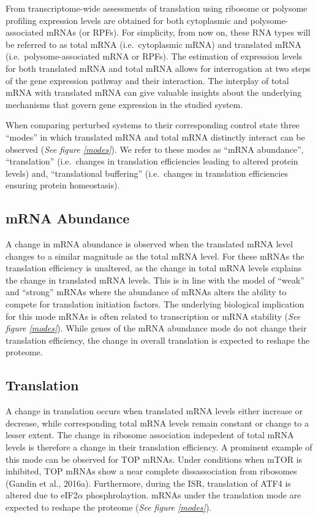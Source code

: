 \documentclass[12pt,openany]{book}
\begin{document}
From transcriptome-wide assessments of translation using ribosome or
polysome profiling expression levels are obtained for both cytoplasmic
and polysome-associated mRNAs (or RPFs). For simplicity, from now on,
these RNA types will be referred to as total mRNA (i.e.~cytoplasmic
mRNA) and translated mRNA (i.e.~polysome-associated mRNA or RPFs). The
estimation of expression levels for both translated mRNA and total mRNA
allows for interrogation at two steps of the gene expression pathway and
their interaction. The interplay of total mRNA with translated mRNA can
give valuable insights about the underlying mechanisms that govern gene
expression in the studied system.

When comparing perturbed systems to their corresponding control state
three ``modes'' in which translated mRNA and total mRNA distinctly
interact can be observed (\emph{See figure \ref{modes}}). We refer to
these modes as ``mRNA abundance'', ``translation'' (i.e.~changes in
translation efficiencies leading to altered protein levels) and,
``translational buffering'' (i.e.~changes in translation efficiencies
ensuring protein homeostasis).

\subsection{mRNA Abundance}

A change in mRNA abundance is observed when the translated mRNA level
changes to a similar magnitude as the total mRNA level. For these mRNAs
the translation efficiency is unaltered, as the change in total mRNA
levels explains the change in translated mRNA levels. This is in line
with the model of ``weak'' and ``strong'' mRNAs where the abundance of
mRNAs alters the ability to compete for translation initiation factors.
The underlying biological implication for this mode mRNAs is often
related to transcription or mRNA stability (\emph{See figure
\ref{modes}}). While genes of the mRNA abundance mode do not change
their translation efficiency, the change in overall translation is
expected to reshape the proteome.

\subsection{Translation}

A change in translation occurs when translated mRNA levels either
increase or decrease, while corresponding total mRNA levels remain
constant or change to a lesser extent. The change in ribosome
association indepedent of total mRNA levels is therefore a change in
their translation efficiency. A prominent example of this mode can be
observed for TOP mRNAs. Under conditions when mTOR is inhibited, TOP
mRNAs show a near complete dissassociation from ribosomes (Gandin et
al., 2016a). Furthermore, during the ISR, translation of ATF4 is altered
due to eIF2\(\alpha\) phosphrolaytion. mRNAs under the translation mode
are expected to reshape the proteome (\emph{See figure \ref{modes}}).
\end{document}
